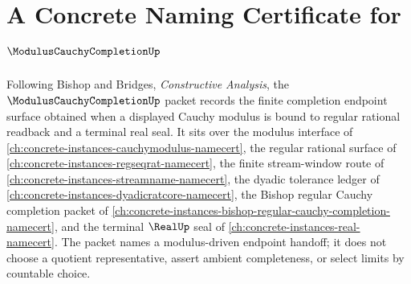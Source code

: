 \chapter{A Concrete Naming Certificate for $\ModulusCauchyCompletionUp$}
\label{ch:concrete-instances-modulus-cauchy-completion-namecert}

Following Bishop and Bridges, \emph{Constructive Analysis}, the $\ModulusCauchyCompletionUp$ packet records the finite completion endpoint surface obtained when a displayed Cauchy modulus is bound to regular rational readback and a terminal real seal. It sits over the modulus interface of \autoref{ch:concrete-instances-cauchymodulus-namecert}, the regular rational surface of \autoref{ch:concrete-instances-regseqrat-namecert}, the finite stream-window route of \autoref{ch:concrete-instances-streamname-namecert}, the dyadic tolerance ledger of \autoref{ch:concrete-instances-dyadicratcore-namecert}, the Bishop regular Cauchy completion packet of \autoref{ch:concrete-instances-bishop-regular-cauchy-completion-namecert}, and the terminal $\RealUp$ seal of \autoref{ch:concrete-instances-real-namecert}. The packet names a modulus-driven endpoint handoff; it does not choose a quotient representative, assert ambient completeness, or select limits by countable choice.

